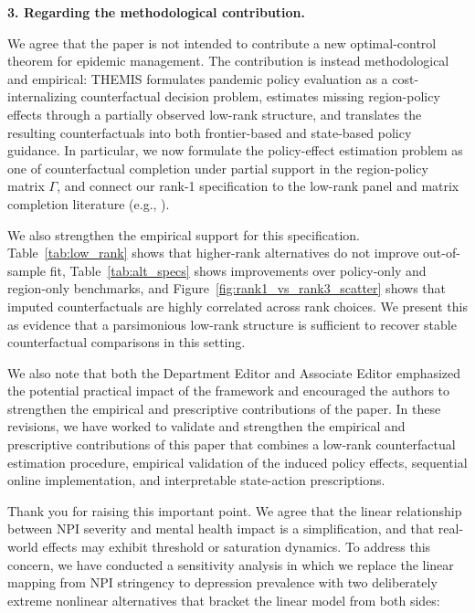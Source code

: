 \documentclass[letterpaper,twoside,11pt]{reviewresponse}
\begin{document}
\textbf{3. Regarding the methodological contribution.}

We agree that the paper is not intended to contribute a new optimal-control theorem for epidemic management. The contribution is instead methodological and empirical: THEMIS formulates pandemic policy evaluation as a cost-internalizing counterfactual decision problem, estimates missing region-policy effects through a partially observed low-rank structure, and translates the resulting counterfactuals into both frontier-based and state-based policy guidance.  In particular, we now formulate the policy-effect estimation problem as one of counterfactual completion under partial support in the region-policy matrix $\Gamma$, and connect our rank-1 specification to the low-rank panel and matrix completion literature (e.g., \citet{bai2009panel, moon2015linear, athey2021matrix}).

We also strengthen the empirical support for this specification. Table~\ref{tab:low_rank} shows that higher-rank alternatives do not improve out-of-sample fit, Table~\ref{tab:alt_specs} shows improvements over policy-only and region-only benchmarks, and Figure~\ref{fig:rank1_vs_rank3_scatter} shows that imputed counterfactuals are highly correlated across rank choices. We present this as evidence that a parsimonious low-rank structure is sufficient to recover stable counterfactual comparisons in this setting.

We also note that both the Department Editor and Associate Editor emphasized the potential practical impact of the framework and encouraged the authors to strengthen the empirical and prescriptive contributions of the paper. In these revisions, we have worked to validate and strengthen the empirical and prescriptive contributions of this paper that combines a low-rank counterfactual estimation procedure, empirical validation of the induced policy effects, sequential online implementation, and interpretable state-action prescriptions.


Thank you for raising this important point. We agree that the linear relationship between NPI severity and mental health impact is a simplification, and that real-world effects may exhibit threshold or saturation dynamics. To address this concern, we have conducted a sensitivity analysis in which we replace the linear mapping from NPI stringency to depression prevalence with two deliberately extreme nonlinear alternatives that bracket the linear model from both sides:
\end{document}
